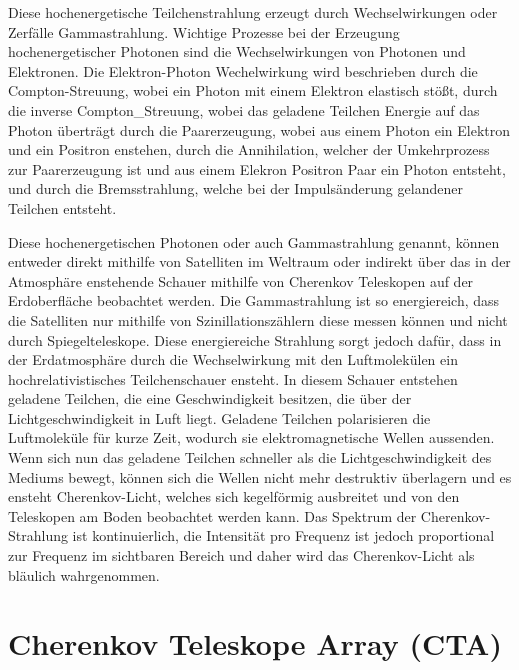 Diese hochenergetische Teilchenstrahlung erzeugt durch Wechselwirkungen oder Zerfälle Gammastrahlung.
Wichtige Prozesse bei der Erzeugung hochenergetischer Photonen sind die Wechselwirkungen von Photonen und Elektronen.
Die Elektron-Photon Wechelwirkung wird beschrieben durch die
Compton-Streuung, wobei ein Photon mit einem Elektron elastisch stößt, durch die inverse Compton_Streuung, wobei das geladene Teilchen Energie auf das Photon
überträgt  durch die Paarerzeugung, wobei aus einem Photon ein Elektron
und ein Positron enstehen, durch die Annihilation, welcher der Umkehrprozess zur Paarerzeugung ist und aus einem Elekron Positron Paar
ein Photon entsteht, und durch die Bremsstrahlung, welche bei der Impulsänderung gelandener Teilchen entsteht.

Diese hochenergetischen Photonen oder auch Gammastrahlung genannt, können entweder direkt mithilfe von Satelliten im Weltraum oder indirekt über das in
der Atmosphäre enstehende Schauer mithilfe von Cherenkov Teleskopen auf der Erdoberfläche beobachtet werden.
Die Gammastrahlung ist so energiereich, dass die Satelliten nur mithilfe von Szinillationszählern diese messen können und nicht durch Spiegelteleskope.
Diese energiereiche Strahlung sorgt jedoch dafür, dass in der Erdatmosphäre durch die Wechselwirkung mit den Luftmolekülen ein hochrelativistisches
Teilchenschauer ensteht.
In diesem Schauer entstehen geladene Teilchen, die eine Geschwindigkeit besitzen, die über der Lichtgeschwindigkeit in Luft liegt.
Geladene Teilchen polarisieren die Luftmoleküle für kurze Zeit, wodurch sie elektromagnetische Wellen aussenden.
Wenn sich nun das geladene Teilchen schneller als die Lichtgeschwindigkeit des Mediums bewegt, können sich die Wellen nicht mehr destruktiv
überlagern und es ensteht Cherenkov-Licht, welches sich kegelförmig ausbreitet und von den Teleskopen am Boden beobachtet werden kann.
Das Spektrum der Cherenkov-Strahlung ist kontinuierlich, die Intensität pro Frequenz ist jedoch proportional zur Frequenz im sichtbaren Bereich und
daher wird das Cherenkov-Licht als bläulich wahrgenommen.

\section{Cherenkov Teleskope Array (CTA)}

